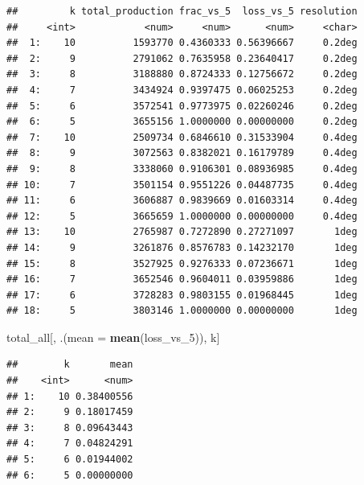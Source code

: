 \documentclass[
  11pt,
]{article}
\newenvironment{Shaded}{\begin{snugshade}}{\end{snugshade}}
\newcommand{\AttributeTok}[1]{\textcolor[rgb]{0.13,0.29,0.53}{#1}}
\newcommand{\FunctionTok}[1]{\textcolor[rgb]{0.13,0.29,0.53}{\textbf{#1}}}
\newcommand{\NormalTok}[1]{#1}
\begin{document}
\begin{verbatim}
##         k total_production frac_vs_5  loss_vs_5 resolution
##     <int>            <num>     <num>      <num>     <char>
##  1:    10          1593770 0.4360333 0.56396667     0.2deg
##  2:     9          2791062 0.7635958 0.23640417     0.2deg
##  3:     8          3188880 0.8724333 0.12756672     0.2deg
##  4:     7          3434924 0.9397475 0.06025253     0.2deg
##  5:     6          3572541 0.9773975 0.02260246     0.2deg
##  6:     5          3655156 1.0000000 0.00000000     0.2deg
##  7:    10          2509734 0.6846610 0.31533904     0.4deg
##  8:     9          3072563 0.8382021 0.16179789     0.4deg
##  9:     8          3338060 0.9106301 0.08936985     0.4deg
## 10:     7          3501154 0.9551226 0.04487735     0.4deg
## 11:     6          3606887 0.9839669 0.01603314     0.4deg
## 12:     5          3665659 1.0000000 0.00000000     0.4deg
## 13:    10          2765987 0.7272890 0.27271097       1deg
## 14:     9          3261876 0.8576783 0.14232170       1deg
## 15:     8          3527925 0.9276333 0.07236671       1deg
## 16:     7          3652546 0.9604011 0.03959886       1deg
## 17:     6          3728283 0.9803155 0.01968445       1deg
## 18:     5          3803146 1.0000000 0.00000000       1deg
\end{verbatim}

\begin{Shaded}
\begin{Highlighting}[]
\NormalTok{total\_all[, .(}\AttributeTok{mean =} \FunctionTok{mean}\NormalTok{(loss\_vs\_5)), k]}
\end{Highlighting}
\end{Shaded}

\begin{verbatim}
##        k       mean
##    <int>      <num>
## 1:    10 0.38400556
## 2:     9 0.18017459
## 3:     8 0.09643443
## 4:     7 0.04824291
## 5:     6 0.01944002
## 6:     5 0.00000000
\end{verbatim}
\end{document}

